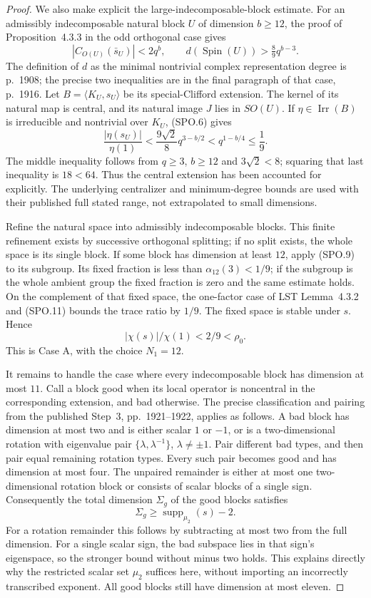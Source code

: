 \begin{proof}
We also make explicit the large-indecomposable-block estimate.
For an admissibly indecomposable natural block $U$ of dimension
$b\ge12$, the proof of Proposition~4.3.3 in the odd orthogonal
case gives
\[
 |C_{O(U)}(\bar s_U)|<2q^b,\qquad
 d(\operatorname{Spin}(U))>\tfrac89q^{b-3}.
 \tag{SPO.10}
\]
The definition of $d$ as the minimal nontrivial complex
representation degree is p.~1908; the precise two inequalities
are in the final paragraph of that case, p.~1916.
Let $B=\langle K_U,s_U\rangle$ be its special-Clifford extension.
The kernel of its natural map is central, and its natural
image $J$ lies in $SO(U)$.  If $\eta\in\operatorname{Irr}(B)$
is irreducible and nontrivial over $K_U$, (SPO.6) gives
\[
 \frac{|\eta(s_U)|}{\eta(1)}
  <\frac{9\sqrt2}{8}q^{3-b/2}
  <q^{1-b/4}\le\frac19.
 \tag{SPO.11}
\]
The middle inequality follows from $q\ge3$, $b\ge12$ and
$3\sqrt2<8$; squaring that last inequality is $18<64$.
Thus the central extension has been accounted for explicitly.
The underlying centralizer and minimum-degree bounds are used
with their published full stated range, not extrapolated to
small dimensions.

Refine the natural space into admissibly indecomposable blocks.
This finite refinement exists by successive orthogonal splitting;
if no split exists, the whole space is its single block.
If some block has dimension at least $12$, apply (SPO.9) to
its subgroup.  Its fixed fraction is less than
$\alpha_{12}(3)<1/9$; if the subgroup is the whole ambient
group the fixed fraction is zero and the same estimate holds.
On the complement of that fixed space, the one-factor case
of LST Lemma~4.3.2 and (SPO.11) bounds the trace ratio by $1/9$.
The fixed space is stable under $s$.  Hence
\[
              |\chi(s)|/\chi(1)<2/9<\rho_0.
 \tag{SPO.12}
\]
This is Case A, with the choice $N_1=12$.

It remains to handle the case where every indecomposable block
has dimension at most $11$.
Call a block good when its local operator is noncentral in
the corresponding extension, and bad otherwise.
The precise classification and pairing from the published
Step~3, pp.~1921--1922, applies as follows.
A bad block has dimension at most two and is either scalar
$1$ or $-1$, or is a two-dimensional rotation with eigenvalue
pair $\{\lambda,\lambda^{-1}\}$, $\lambda\ne\pm1$.
Pair different bad types, and then pair equal remaining
rotation types.  Every such pair becomes good and has
dimension at most four.  The unpaired remainder is either
at most one two-dimensional rotation block or consists
of scalar blocks of a single sign.
Consequently the total dimension $\Sigma_g$ of the good
blocks satisfies
\[
              \Sigma_g\ge\operatorname{supp}_{\mu_2}(s)-2.
 \tag{SPO.13}
\]
For a rotation remainder this follows by subtracting at most
two from the full dimension.  For a single scalar sign,
the bad subspace lies in that sign's eigenspace, so the
stronger bound without minus two holds.  This explains
directly why the restricted scalar set $\mu_2$ suffices
here, without importing an incorrectly transcribed exponent.
All good blocks still have dimension at most eleven.


\end{proof}
